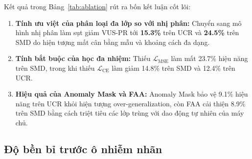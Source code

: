 \documentclass[sigconf,nonacm]{acmart}
\begin{document}
\begin{table}[htbp]
\centering
\caption{Kết quả nghiên cứu triệt tiêu (Ablation Study) trên hai tập UCR và SMD theo chỉ số VUS-PR}
\label{tab:ablation}
\footnotesize
{}
\end{table}

Kết quả trong Bảng~\ref{tab:ablation} rút ra bốn kết luận cốt lõi:
\begin{enumerate}[leftmargin=*, itemsep=1pt, parsep=0pt]
    \item \textbf{Tính ưu việt của phân loại đa lớp so với nhị phân:} Chuyển sang mô hình nhị phân làm sụt giảm VUS-PR tới \textbf{15.3\%} trên UCR và \textbf{24.5\%} trên SMD do hiện tượng mất cân bằng mẫu và khoảng cách đa dạng.
    \item \textbf{Tính bắt buộc của học đa nhiệm:} Thiếu $\mathcal{L}_{\text{MSE}}$ làm mất 23.7\% hiệu năng trên SMD, trong khi thiếu $\mathcal{L}_{\text{CE}}$ làm giảm 14.8\% trên SMD và 12.4\% trên UCR.
    \item \textbf{Hiệu quả của Anomaly Mask và FAA:} Anomaly Mask bảo vệ 9.1\% hiệu năng trên UCR khỏi hiện tượng over-generalization, còn FAA cải thiện 8.9\% trên SMD bằng cách triệt tiêu các lớp trùng với dao động tự nhiên của máy chủ.
\end{enumerate}

\subsection{Độ bền bỉ trước ô nhiễm nhãn}
\end{document}
